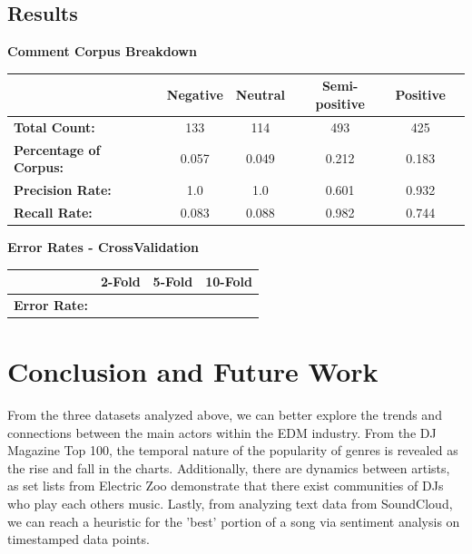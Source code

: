 \documentclass[12pt]{dalcsthesis}
\begin{document}
\section{Results}

\textbf{Comment Corpus Breakdown}

\begin{center}
  \begin{tabular}{ l | c | c | c | c | c }
    \hline
	 & \textbf{Negative} & \textbf{Neutral} & \textbf{Semi-positive} & \textbf{Positive} \\ \hline
    \textbf{Total Count:} & 133 & 114 & 493 & 425 \\ \hline
    \textbf{Percentage of Corpus:} & 0.057 & 0.049 & 0.212 & 0.183 \\ \hline
    \textbf{Precision Rate:} & 1.0  & 1.0 & 0.601 & 0.932 \\ \hline
    \textbf{Recall Rate:} & 0.083 & 0.088 & 0.982 & 0.744 \\
    \hline
  \end{tabular}
\end{center}

\noindent
\textbf{Error Rates - CrossValidation}

\begin{center}
  \begin{tabular}{ l | c | c | c }
    \hline
	 & \textbf{2-Fold} & \textbf{5-Fold} & \textbf{10-Fold} \\ \hline
    \textbf{Error Rate:} &  &  &  \\ 
    \hline
  \end{tabular}
\end{center}


\chapter{Conclusion and Future Work}

From the three datasets analyzed above, we can better explore the trends and connections between the main actors within the EDM industry. From the DJ Magazine Top 100, the temporal nature of the popularity of genres is revealed as the rise and fall in the charts. Additionally, there are dynamics between artists, as set lists from Electric Zoo demonstrate that there exist communities of DJs who play each others music. Lastly, from analyzing text data from SoundCloud, we can reach a heuristic for the 'best' portion of a song via sentiment analysis on timestamped data points. \\
\end{document}
